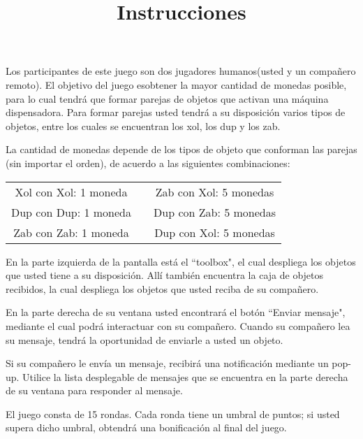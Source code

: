 \documentclass{article}
\title{Instrucciones}
\author{}
\date{}
\begin{document}
\thispagestyle{empty}

\begin{multicols}{2}{
\noindent Los participantes de este juego son dos jugadores humanos\linebreak (usted y un compañero remoto). El objetivo del juego es\linebreak obtener la mayor cantidad de monedas posible, para lo cual tendrá que formar parejas de objetos que activan una máquina dispensadora. Para formar parejas usted tendrá a su disposición varios tipos de objetos, entre los cuales se encuentran los xol, los dup y los zab. 

\vspace{0.5\baselineskip}

\noindent La cantidad de monedas depende de los tipos de objeto que conforman las parejas (sin importar el orden), de acuerdo a las siguientes combinaciones:

\vspace{-0.25\baselineskip}

\begin{tabular}{ccc}\\
Xol con Xol: 1 moneda && Zab con Xol: 5 monedas\\
Dup con Dup: 1 moneda && Dup con Zab: 5 monedas\\
Zab con Zab: 1 moneda && Dup con Xol: 5 monedas
\end{tabular}

\vspace{0.5\baselineskip}

\noindent En la parte izquierda de la pantalla está el ``toolbox", el cual despliega los objetos que usted tiene a su disposición. Allí también encuentra la caja de objetos recibidos, la cual despliega los objetos que usted reciba de su compañero.

\vspace{0.5\baselineskip}

\noindent En la parte derecha de su ventana usted encontrará el botón ``Enviar mensaje", mediante el cual podrá interactuar con su compañero. Cuando su compañero lea su mensaje, tendrá la oportunidad de enviarle a usted un objeto. 

\vspace{0.5\baselineskip}

\noindent Si su compañero le envía un mensaje, recibirá una notificación mediante un pop-up. Utilice la lista desplegable de mensajes que se encuentra en la parte derecha de su ventana para responder al mensaje.

\vspace{0.5\baselineskip}

\noindent El juego consta de 15 rondas. Cada ronda tiene un umbral de puntos; si usted supera dicho umbral, obtendrá una bonificación al final del juego.
}\end{multicols}
\end{document}
